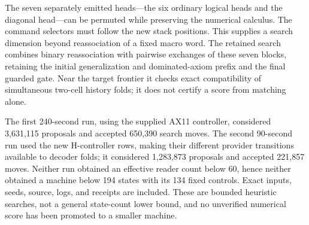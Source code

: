 The seven separately emitted heads---the six ordinary logical heads and
the diagonal head---can be permuted while preserving the numerical
calculus. The command selectors must follow the new stack positions.
This supplies a search dimension beyond reassociation of a fixed macro
word. The retained search combines binary reassociation with pairwise
exchanges of these seven blocks, retaining the initial generalization
and dominated-axiom prefix and the final guarded gate. Near the target
frontier it checks exact compatibility of simultaneous two-cell history
folds; it does not certify a score from matching alone.

The first 240-second run, using the supplied AX11 controller, considered
3,631,115 proposals and accepted 650,390 search moves. The second
90-second run used the new H-controller rows, making their different
provider transitions available to decoder folds; it considered
1,283,873 proposals and accepted 221,857 moves. Neither run obtained an
effective reader count below 60, hence neither obtained a machine below
194 states with its 134 fixed controls. Exact inputs, seeds, source,
logs, and receipts are included. These are bounded heuristic searches,
not a general state-count lower bound, and no unverified numerical score
has been promoted to a smaller machine.
